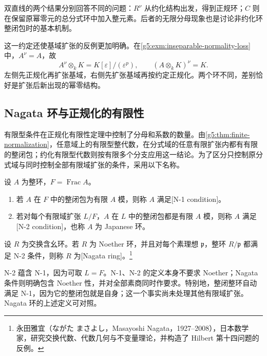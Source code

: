 双直线的两个结果分别回答不同的问题：\(R^\nu\) 从约化结构出发，得到正规环；\(C\) 则在保留原幂零元的总分式环中加入整元素。后者的无限分母现象也是\cite[第33节，第264页]{Matsumura1989}讨论非约化环整闭包时的基本机制。

\ProseParagraphBreak

这一约定还使基域扩张的反例更加明确。在\cref{g5:exm:inseparable-normality-loss}中，\(A^\nu=A\)，故
\[
	A^\nu\otimes_k K=K[\varepsilon]/(\varepsilon^p),
	\qquad
	(A\otimes_k K)^\nu=K.
\]
左侧先正规化再扩张基域，右侧先扩张基域再按约定正规化。两个环不同，差别恰好是扩张后新出现的幂零结构。

\subsection{Nagata 环与正规化的有限性}
\label{g5:subsec:0404:04}

有限型条件在正规化有限性定理中控制了分母和系数的数量。由\cref{g5:thm:finite-normalization}，任意域上的有限型整代数，在分式域的任意有限扩张内都有有限的整闭包；约化有限型代数则按有限多个分支应用这一结论。为了区分只控制原分式域与同时控制全部有限域扩张的条件，采用以下名称。

\begin{definition}
\label{g5:def:nagata-ring}
	设 \(A\) 为整环，\(F=\operatorname{Frac}A\)。
	\begin{enumerate}
		\item 若 \(A\) 在 \(F\) 中的整闭包为有限 \(A\) 模，则称 \(A\) 满足[N-1 condition]。
		\item 若对每个有限域扩张 \(L/F\)，\(A\) 在 \(L\) 中的整闭包都是有限 \(A\) 模，则称 \(A\) 满足[N-2 condition]，也称 \(A\) 为 Japanese 环。
	\end{enumerate}
	设 \(R\) 为交换含幺环。若 \(R\) 为 Noether 环，并且对每个素理想 \(\mathfrak p\)，整环 \(R/\mathfrak p\) 都满足 N-2 条件，则称 \(R\) 为[Nagata ring]。\footnote{永田雅宜（ながた まさよし，Masayoshi Nagata，1927--2008），日本数学家，研究交换代数、代数几何与不变量理论，并构造了 Hilbert 第十四问题的反例。}
\end{definition}

N-2 蕴含 N-1，因为可取 \(L=F\)。N-1、N-2 的定义本身不要求 Noether；Nagata 条件则明确包含 Noether 性，并对全部素商同时作要求。特别地，整闭整环自动满足 N-1，因为它的整闭包就是自身；这一个事实尚未处理其他有限域扩张。Nagata 环的上述定义可对照\cite[第33节，第264页]{Matsumura1989}。

